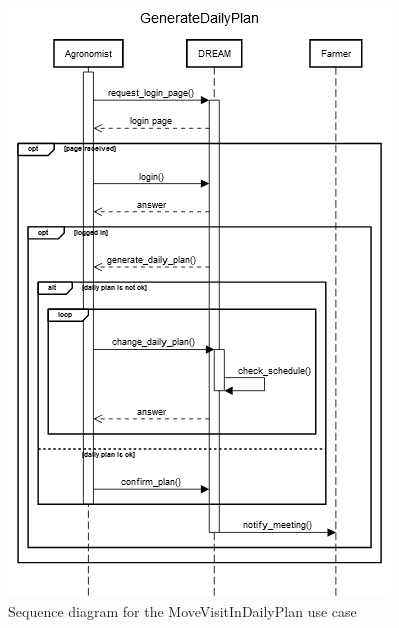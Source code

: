 \documentclass{article}
\begin{document}
\begin{figure}[H]
    \centering
    \includegraphics[scale=0.75]{sequence_diagrams/GenerateDailyPlan}
    \caption{Sequence diagram for the MoveVisitInDailyPlan use case}
\end{figure}

\end{document}
